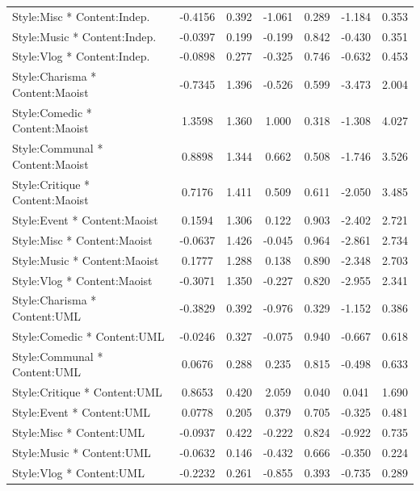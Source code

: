 \documentclass[12pt,a4paper]{report}
\begin{document}
\begin{table}
\begin{tabular}{@{}l S[table-format=-1.4] S[table-format=1.3] S[table-format=-1.3] S[table-format=1.3] S[table-format=-1.3] S[table-format=1.3]@{}}
        Style:Misc * Content:Indep.          & -0.4156 & 0.392 & -1.061 & 0.289 & -1.184 & 0.353 \\
        Style:Music * Content:Indep.         & -0.0397 & 0.199 & -0.199 & 0.842 & -0.430 & 0.351 \\
        Style:Vlog * Content:Indep.          & -0.0898 & 0.277 & -0.325 & 0.746 & -0.632 & 0.453 \\ \addlinespace
        Style:Charisma * Content:Maoist      & -0.7345 & 1.396 & -0.526 & 0.599 & -3.473 & 2.004 \\
        Style:Comedic * Content:Maoist       & 1.3598  & 1.360 & 1.000  & 0.318 & -1.308 & 4.027 \\
        Style:Communal * Content:Maoist      & 0.8898  & 1.344 & 0.662  & 0.508 & -1.746 & 3.526 \\
        Style:Critique * Content:Maoist      & 0.7176  & 1.411 & 0.509  & 0.611 & -2.050 & 3.485 \\
        Style:Event * Content:Maoist         & 0.1594  & 1.306 & 0.122  & 0.903 & -2.402 & 2.721 \\
        Style:Misc * Content:Maoist          & -0.0637 & 1.426 & -0.045 & 0.964 & -2.861 & 2.734 \\
        Style:Music * Content:Maoist         & 0.1777  & 1.288 & 0.138  & 0.890 & -2.348 & 2.703 \\
        Style:Vlog * Content:Maoist          & -0.3071 & 1.350 & -0.227 & 0.820 & -2.955 & 2.341 \\ \addlinespace
        Style:Charisma * Content:UML         & -0.3829 & 0.392 & -0.976 & 0.329 & -1.152 & 0.386 \\
        Style:Comedic * Content:UML          & -0.0246 & 0.327 & -0.075 & 0.940 & -0.667 & 0.618 \\
        Style:Communal * Content:UML         & 0.0676  & 0.288 & 0.235  & 0.815 & -0.498 & 0.633 \\
        Style:Critique * Content:UML         & 0.8653  & 0.420 & 2.059  & 0.040 & 0.041  & 1.690 \\
        Style:Event * Content:UML            & 0.0778  & 0.205 & 0.379  & 0.705 & -0.325 & 0.481 \\
        Style:Misc * Content:UML             & -0.0937 & 0.422 & -0.222 & 0.824 & -0.922 & 0.735 \\
        Style:Music * Content:UML            & -0.0632 & 0.146 & -0.432 & 0.666 & -0.350 & 0.224 \\
        Style:Vlog * Content:UML             & -0.2232 & 0.261 & -0.855 & 0.393 & -0.735 & 0.289 \\

\end{tabular}
\end{table}
\end{document}
